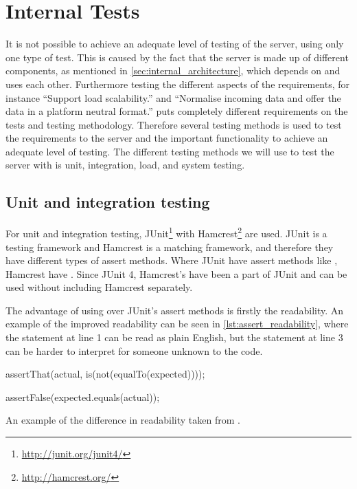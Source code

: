 \section{Internal Tests}
It is not possible to achieve an adequate level of testing of the server, using only one type of test.
This is caused by the fact that the server is made up of different components,
as mentioned in \cref{sec:internal_architecture},
which depends on and uses each other.
Furthermore testing the different aspects of the requirements, for instance ``Support load scalability.''
and ``Normalise incoming data and offer the data in a platform neutral format.'' puts completely different
requirements on the tests and testing methodology.
Therefore several testing methods is used to test the requirements to the server
and the important functionality to achieve an adequate level of testing.
The different testing methods we will use to test the server with is unit, integration, load, and system testing.

\subsection{Unit and integration testing}
For unit and integration testing, JUnit\footnote{\url{http://junit.org/junit4/}} with Hamcrest\footnote{\url{http://hamcrest.org/}} are used.
JUnit is a testing framework and Hamcrest is a matching framework, and therefore they have different types of assert methods.
Where JUnit have assert methods like , Hamcrest have .
Since JUnit 4, Hamcrest's  have been a part of JUnit and can be used without including Hamcrest separately\cite{hamcrest_vs_junit}.

The advantage of using  over JUnit's assert methods is firstly the readability.
An example of the improved readability can be seen in \cref{lst:assert_readability},
where the  statement at line 1 can be read as plain English,
but the  statement at line 3 can be harder to interpret for someone unknown to the code\cite{hamcrest_vs_junit}.

\begin{listing}
    \begin{java2}
        assertThat(actual, is(not(equalTo(expected))));

        assertFalse(expected.equals(actual));
    \end{java2}
    \caption{An example of the difference in readability taken from \cite{hamcrest_vs_junit}.}
    \label{lst:assert_readability}
\end{listing}

